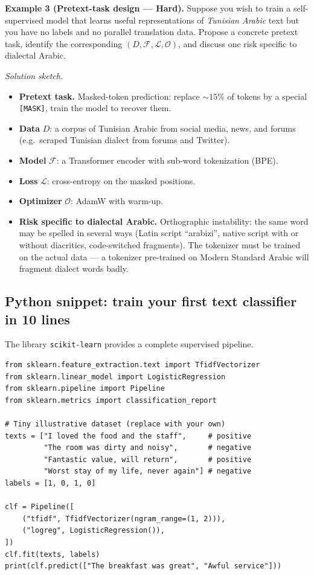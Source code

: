 \documentclass[12pt,a4paper]{report}
\theoremstyle{definition}
\theoremstyle{remark}
\begin{document}
\medskip

\textbf{Example 3 (Pretext-task design --- Hard).}
Suppose you wish to train a self-supervised model that learns useful representations of \emph{Tunisian Arabic} text but you have no labels and no parallel translation data. Propose a concrete pretext task, identify the corresponding $(D, \mathcal{F}, \mathcal{L}, \mathcal{O})$, and discuss one risk specific to dialectal Arabic.

\textit{Solution sketch.}
\begin{itemize}
    \item \textbf{Pretext task.} Masked-token prediction: replace $\sim 15\%$ of tokens by a special \texttt{[MASK]}, train the model to recover them.
    \item \textbf{Data} $D$: a corpus of Tunisian Arabic from social media, news, and forums (e.g.\ scraped Tunisian dialect from forums and Twitter).
    \item \textbf{Model} $\mathcal{F}$: a Transformer encoder with sub-word tokenization (BPE).
    \item \textbf{Loss} $\mathcal{L}$: cross-entropy on the masked positions.
    \item \textbf{Optimizer} $\mathcal{O}$: AdamW with warm-up.
    \item \textbf{Risk specific to dialectal Arabic.} Orthographic instability: the same word may be spelled in several ways (Latin script ``arabizi'', native script with or without diacritics, code-switched fragments). The tokenizer must be trained on the actual data --- a tokenizer pre-trained on Modern Standard Arabic will fragment dialect words badly.
\end{itemize}

\subsection{Python snippet: train your first text classifier in 10 lines}

The library \texttt{scikit-learn} provides a complete supervised pipeline.

\begin{lstlisting}
from sklearn.feature_extraction.text import TfidfVectorizer
from sklearn.linear_model import LogisticRegression
from sklearn.pipeline import Pipeline
from sklearn.metrics import classification_report

# Tiny illustrative dataset (replace with your own)
texts = ["I loved the food and the staff",     # positive
         "The room was dirty and noisy",       # negative
         "Fantastic value, will return",       # positive
         "Worst stay of my life, never again"] # negative
labels = [1, 0, 1, 0]

clf = Pipeline([
    ("tfidf", TfidfVectorizer(ngram_range=(1, 2))),
    ("logreg", LogisticRegression()),
])
clf.fit(texts, labels)
print(clf.predict(["The breakfast was great", "Awful service"]))
\end{lstlisting}
\end{document}
